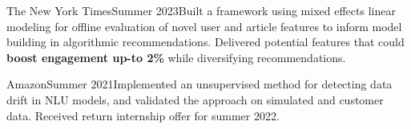   {The New York Times}{Summer 2023}{}{Built a framework using mixed effects linear modeling for offline evaluation of novel user and article features to inform model building in algorithmic recommendations. Delivered potential features that could \textbf{boost engagement up-to 2\%} while diversifying recommendations.}


  {Amazon}{Summer 2021}{}{Implemented an unsupervised method for detecting data drift in NLU models, and validated the approach on simulated and customer data. Received return internship offer for summer 2022.}
